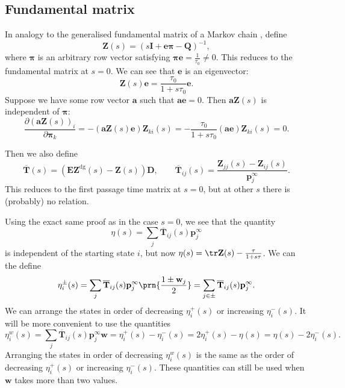 \documentclass[12pt]{article}
\newcommand{\inv}{^{-1}}
\newcommand{\dg}{^\mathrm{dg}}
\newcommand{\I}{\mathbf{I}}
\newcommand{\onev}{\mathbf{e}}
\newcommand{\onem}{\mathbf{E}}
\newcommand{\MM}{\mathbf{Q}}
\newcommand{\pr}{\mathbf{p}}
\newcommand{\eq}{\pr^\infty}
\newcommand{\fpt}{\mathbf{T}}
\newcommand{\fptb}{\overline{\fpt}}
\newcommand{\fund}{\mathbf{Z}}
\newcommand{\D}{\mathbf{D}}
\newcommand{\pib}{\boldsymbol{\pi}}
\newcommand{\w}{\mathbf{w}}
\renewcommand{\pdiff}[2]{\frac{\partial #1}{\partial #2}}
\begin{document}
\subsection{Fundamental matrix \etc}\label{sec:lfund}

In analogy to the generalised fundamental matrix of a Markov chain \cite{Kemeny1981fund}, define
%
\begin{equation}\label{eq:lfund}
  \fund(s) = (s\I +\onev\pib -\MM)\inv,
\end{equation}
%
where $\pib$ is an arbitrary row vector satisfying $\pib\onev = \frac{1}{\tau_0} \neq 0$.
This reduces to the fundamental matrix at $s=0$.
We can see that $\onev$ is an eigenvector:
%
\begin{equation}\label{eq:lfundrowsum}
  \fund(s)\onev = \frac{\tau_0}{1+s\tau_0}\onev.
\end{equation}
%
Suppose we have some row vector $\mathbf{a}$ such that $\mathbf{a}\onev=0$.
Then $\mathbf{a}\fund(s)$ is independent of $\pib$:
%
\begin{equation}\label{eq:alfund}
  \pdiff{(\mathbf{a}\fund(s))_i}{\pib_k} = -(\mathbf{a}\fund(s)\onev) \fund_{ki}(s)
      = -\frac{\tau_0}{1+s\tau_0} (\mathbf{a}\onev) \fund_{ki}(s) = 0.
\end{equation}
%


Then we also define
%
\begin{equation}\label{eq:lfptb}
  \fptb(s) = (\onem\fund\dg(s)-\fund(s))\D,
  \qquad
  \fptb_{ij}(s) = \frac{\fund_{jj}(s)-\fund_{ij}(s)}{\eq_j}.
\end{equation}
%
This reduces to the first passage time matrix at $s=0$, but at other $s$ there is (probably) no relation.

Using the exact same proof as in the case $s=0$, we see that the quantity
%
\begin{equation}\label{eq:lkemeny}
  \eta(s) = \sum_j \fptb_{ij}(s)\eq_j
\end{equation}
%
is independent of the starting state $i$, but now $\eta(s) = \tr\fund(s) - \frac{\tau}{1+s\tau}$.
We can the define
%
\begin{equation}\label{eq:lpmixtime}
  \eta^{\pm}_i(s) = \sum_j \fptb_{ij}(s)\eq_j \prn{\frac{1\pm\w_j}{2}} =  \sum_{j\in\pm} \fptb_{ij}(s)\eq_j.
\end{equation}
%
We can arrange the states in order of decreasing $\eta^{+}_i(s)$ or increasing $\eta^{-}_i(s)$.
It will be more convenient to use the quantities
%
\begin{equation}\label{eq:lwpmixtime}
  \eta^w_i(s) = \sum_j \fptb_{ij}(s)\eq_j \w
    = \eta^+_i(s) - \eta^-_i(s) =2\eta^+_i(s) - \eta(s) =\eta(s) - 2\eta^-_i(s) .
\end{equation}
%
Arranging the states in order of decreasing $\eta^w_i(s)$ is the same as the order of decreasing $\eta^{+}_i(s)$ or increasing $\eta^{-}_i(s)$.
These quantities can still be used when $\w$ takes more than two values.
\end{document}
